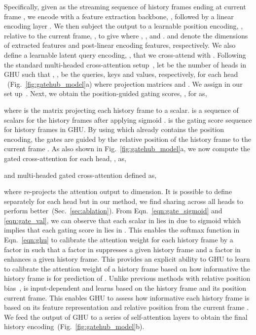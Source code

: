 \documentclass[10pt,twocolumn,letterpaper]{article}
\begin{document}
Specifically, given  
as the streaming sequence of  history frames ending at current frame , we encode  with a feature extraction backbone, , followed by a linear encoding layer . We then subject the output to a learnable position encoding, , relative to the current frame, , to give  
where , ,  and .  and  denote the dimensions of extracted features and post-linear encoding features, respectively. We also define a learnable latent query encoding, , that we cross-attend with . Following the standard multi-headed cross-attention setup~\cite{jaegle2021perceiver, jaegle2021perceiverio}, let  be the number of heads in GHU such that , ,  be the queries, keys and values, respectively, for each head ~(Fig.~\ref{fig:gatehub_model}a) where projection matrices  and . We assign  in our set up~\cite{vaswani2017attention}. Next, we obtain the position-guided gating scores, , for  as,

where  is the matrix projecting each history frame to a scalar.  is a sequence of scalars for the history frames  after applying sigmoid .  is the gating score sequence for history frames in GHU. By using  which already contains the position encoding, the gates are guided by the relative position of the history frame to the current frame . As also shown in Fig.~\ref{fig:gatehub_model}a, we now compute the gated cross-attention for each head, , as,

and multi-headed gated cross-attention defined as,

where  re-projects the attention output to  dimension.  It is possible to define  separately for each head but in our method, we find sharing  across all heads to perform better~(Sec.~\ref{sec:ablation}). From Eqn.~\ref{eqn:gate_sigmoid} and \ref{eqn:gate_val}, we can observe that each scalar in  lies in  due to sigmoid which implies that each gating score in  lies in . This enables the softmax function in Eqn.~\ref{eqn:ghu} to calibrate the attention weight for each history frame by a factor in  such that a factor in  suppresses a given history frame and a factor in  enhances a given history frame. This provides an explicit ability to GHU to learn to calibrate the attention weight of a history frame based on how informative the history frame is for prediction of . 
Unlike previous methods with relative position bias~\cite{liu2021swin,dai2019transformer},  is input-dependent and learns based on the history frame and its position \wrt current frame. This enables GHU to assess how informative each history frame is based on its feature representation and relative position from the current frame . We feed the output of GHU to a series of  self-attention layers to obtain the final history encoding~(Fig.~\ref{fig:gatehub_model}b).
\end{document}
